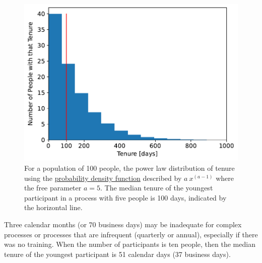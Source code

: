 \begin{figure}[!htb] %
    \centering %
    \iftoggle{narrowpage}{\newcommand\imgwidth{1}}{\newcommand\imgwidth{0.7}}
    \includegraphics[width=\imgwidth\textwidth]{images/tenure_power_distribution_a5_with_max_tenure10_and_5_participants.pdf}
    \caption{For a population of 100 people, the power law distribution of tenure using the \href{https://en.wikipedia.org/wiki/Probability_density_function}{probability density function}
    described by $a\ x^{(a-1)}$ where the free parameter $a=5$. The median tenure of the youngest participant  in a process with five people is 100 days, indicated by the horizontal line. }
    \label{fig:tenure-powerlaw-5-participants-tenure10}
\end{figure}


Three calendar months (or 70 business days) may be inadequate for complex processes or processes that are infrequent (quarterly or annual), especially if there was no training. When the number of participants is ten people, then the median tenure of the youngest participant is 51 calendar days (37 business days).

\ \\


